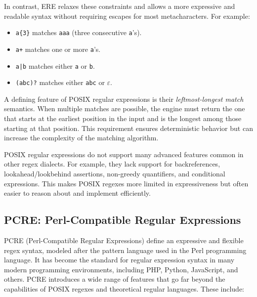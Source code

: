 In contrast, ERE relaxes these constraints and allows a more expressive and readable syntax without requiring escapes for most metacharacters. For example:
\begin{itemize}
	\item \texttt{a\{3\}} matches \texttt{aaa} (three consecutive \texttt{a}'s).
	\item \texttt{a+} matches one or more \texttt{a}'s.
	\item \texttt{a|b} matches either \texttt{a} or \texttt{b}.
	\item \texttt{(abc)?} matches either \texttt{abc} or $\varepsilon$.
\end{itemize}

A defining feature of POSIX regular expressions is their \textit{leftmost-longest match} semantics. When multiple matches are possible, the engine must return the one that starts at the earliest position in the input and is the longest among those starting at that position. This requirement ensures deterministic behavior but can increase the complexity of the matching algorithm. \cite{regex_opengroup}


POSIX regular expressions do not support many advanced features common in other regex dialects. For example, they lack support for backreferences, lookahead/lookbehind assertions, non-greedy quantifiers, and conditional expressions. This makes POSIX regexes more limited in expressiveness but often easier to reason about and implement efficiently.

\subsection{PCRE: Perl-Compatible Regular Expressions}
PCRE (Perl-Compatible Regular Expressions) define an expressive and flexible regex syntax, modeled after the pattern language used in the Perl programming language. It has become the standard for regular expression syntax in many modern programming environments, including PHP, Python, JavaScript, and others.
PCRE introduces a wide range of features that go far beyond the capabilities of POSIX regexes and theoretical regular languages. These include:

